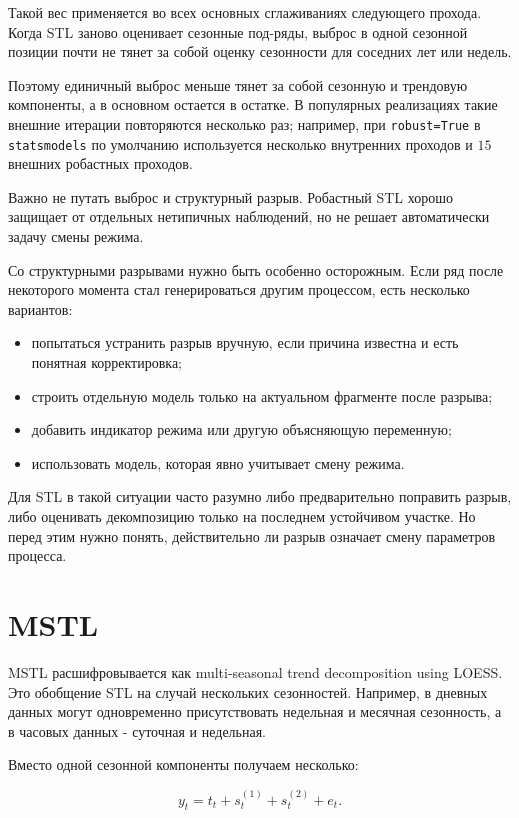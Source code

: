 \documentclass[12pt,fleqn]{article}
\begin{document}
Такой вес применяется во всех основных сглаживаниях следующего прохода.
Когда STL заново оценивает сезонные под-ряды, выброс в одной сезонной позиции почти не тянет за собой оценку сезонности для соседних лет или недель.

Поэтому единичный выброс меньше тянет за собой сезонную и трендовую компоненты, а в основном остается в остатке.
В популярных реализациях такие внешние итерации повторяются несколько раз; например, при \texttt{robust=True} в \texttt{statsmodels} по умолчанию используется несколько внутренних проходов и \(15\) внешних робастных проходов.

Важно не путать выброс и структурный разрыв.
Робастный STL хорошо защищает от отдельных нетипичных наблюдений, но не решает автоматически задачу смены режима.

Со структурными разрывами нужно быть особенно осторожным.
Если ряд после некоторого момента стал генерироваться другим процессом, есть несколько вариантов:

\begin{itemize}
  \item попытаться устранить разрыв вручную, если причина известна и есть понятная корректировка;
  \item строить отдельную модель только на актуальном фрагменте после разрыва;
  \item добавить индикатор режима или другую объясняющую переменную;
  \item использовать модель, которая явно учитывает смену режима.
\end{itemize}

Для STL в такой ситуации часто разумно либо предварительно поправить разрыв, либо оценивать декомпозицию только на последнем устойчивом участке.
Но перед этим нужно понять, действительно ли разрыв означает смену параметров процесса.


\section{MSTL}


MSTL расшифровывается как multi-seasonal trend decomposition using LOESS.
Это обобщение STL на случай нескольких сезонностей.
Например, в дневных данных могут одновременно присутствовать недельная и месячная сезонность, а в часовых данных - суточная и недельная.

Вместо одной сезонной компоненты получаем несколько:

\[
y_t
=
t_t
+s_t^{(1)}
+s_t^{(2)}
+e_t.
\]
\end{document}
